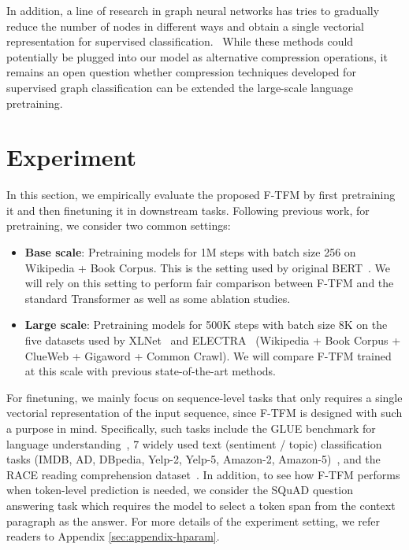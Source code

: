 \documentclass{article}
\theoremstyle{custom}
\begin{document}
In addition, a line of research in graph neural networks has tries to gradually reduce the number of nodes in different ways and obtain a single vectorial representation for supervised classification.~\cite{ying2018hierarchical,gao2019graph,lee2019self}
While these methods could potentially be plugged into our model as alternative compression operations, it remains an open question whether compression techniques developed for supervised graph classification can be extended the large-scale language pretraining. \section{Experiment}
\label{sec:experiment}
In this section, we empirically evaluate the proposed F-TFM by first pretraining it and then finetuning it in downstream tasks.
Following previous work, for pretraining, we consider two common settings:
\begin{itemize}[leftmargin=*,itemsep=0em,parsep=0em,topsep=0em]
\item \textbf{Base scale}: Pretraining models for 1M steps with batch size 256 on Wikipedia + Book Corpus. This is the setting used by original BERT~\cite{devlin2018bert}. 
We will rely on this setting to perform fair comparison between F-TFM and the standard Transformer as well as some ablation studies.
\item \textbf{Large scale}: Pretraining models for 500K steps with batch size 8K on the five datasets used by XLNet~\cite{yang2019xlnet} and ELECTRA~\cite{clark2020electra} (Wikipedia + Book Corpus + ClueWeb + Gigaword + Common Crawl).
We will compare F-TFM trained at this scale with previous state-of-the-art methods.
\end{itemize}
For finetuning, we mainly focus on sequence-level tasks that only requires a single vectorial representation of the input sequence, since F-TFM is designed with such a purpose in mind.
Specifically, such tasks include the GLUE benchmark for language understanding~\cite{wang2018glue}, 7 widely used text (sentiment / topic) classification tasks (IMDB, AD, DBpedia, Yelp-2, Yelp-5, Amazon-2, Amazon-5)~\cite{zhang2015character}, and the RACE reading comprehension dataset~\cite{lai2017race}.
In addition, to see how F-TFM performs when token-level prediction is needed, we consider the SQuAD question answering task which requires the model to select a token span from the context paragraph as the answer.
For more details of the experiment setting, we refer readers to Appendix \ref{sec:appendix-hparam}.
\end{document}
